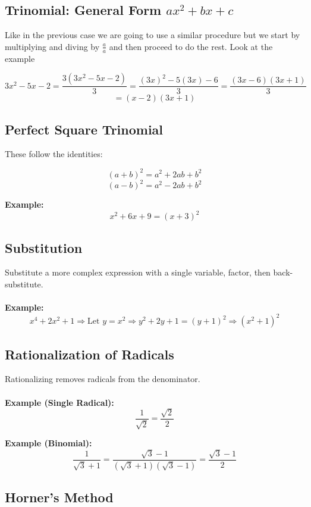\subsection{Trinomial: General Form \texorpdfstring{\(ax^2 + bx + c\)}{ax² + bx + c}}

Like in the previous case we are going to use a similar procedure but we start by
multiplying and diving by \(\frac{a}{a}\) and then proceed to do the rest. Look at the example

\[
3x^2 -5x - 2 = \frac{3(3x^2 -5x - 2)}{3} = \frac{(3x)^2 -5(3x) - 6}{3} = \frac{(3x- 6)(3x+1)}{3} 
\]
\[
= (x- 2)(3x +1)
\]

\subsection{Perfect Square Trinomial}

These follow the identities:

\[
(a + b)^2 = a^2 + 2ab + b^2
\]
\[
(a - b)^2 = a^2 - 2ab + b^2
\]

\textbf{Example:}
\[
x^2 + 6x + 9 = (x + 3)^2
\]

\subsection{Substitution}

Substitute a more complex expression with a single variable, factor, then back-substitute.
\\\\
\textbf{Example:}
\[
x^4 + 2x^2 + 1 \Rightarrow \text{Let } y = x^2 \Rightarrow y^2 + 2y + 1 = (y + 1)^2 \Rightarrow (x^2 + 1)^2
\]

\subsection{Rationalization of Radicals}

Rationalizing removes radicals from the denominator.
\\\\
\textbf{Example (Single Radical):}
\[
\frac{1}{\sqrt{2}} = \frac{\sqrt{2}}{2}
\]

\textbf{Example (Binomial):}
\[
\frac{1}{\sqrt{3} + 1} = \frac{\sqrt{3} - 1}{(\sqrt{3} + 1)(\sqrt{3} - 1)} = \frac{\sqrt{3} - 1}{2}
\]

\subsection{Horner’s Method}

